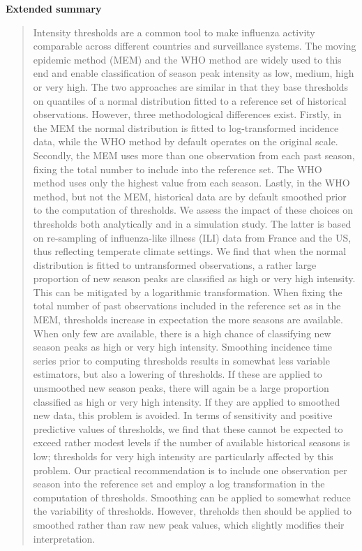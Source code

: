 \documentclass{article}
\begin{document}
\begin{center}
\textbf{Extended summary}
\end{center}

{\begin{quote}
\footnotesize Intensity thresholds are a common tool to make influenza activity comparable across different countries and surveillance systems. The moving epidemic method (MEM) and the WHO method are widely used to this end and enable classification of season peak intensity as low, medium, high or very high. The two approaches are similar in that they base thresholds on quantiles of a normal distribution fitted to a reference set of historical observations. However, three methodological differences exist. Firstly, in the MEM the normal distribution is fitted to log-transformed incidence data, while the WHO method by default operates on the original scale. Secondly, the MEM uses more than one observation from each past season, fixing the total number to include into the reference set. The WHO method uses only the highest value from each season. Lastly, in the WHO method, but not the MEM, historical data are by default  smoothed prior to the computation of thresholds. We assess the impact of these choices on thresholds both analytically and in a simulation study. The latter is based on re-sampling of influenza-like illness (ILI) data from France and the US, thus reflecting temperate climate settings. We find that when the normal distribution is fitted to untransformed observations, a rather large proportion of new season peaks are classified as high or very high intensity. This can be mitigated by a logarithmic transformation. When fixing the total number of past observations included in the reference set as in the MEM, thresholds increase in expectation the more seasons are available. When only few are available, there is a high chance of classifying new season peaks as high or very high intensity. Smoothing incidence time series prior to computing thresholds results in somewhat less variable estimators, but also a lowering of thresholds. If these are applied to unsmoothed new season peaks, there will again be a large proportion classified as high or very high intensity. If they are applied to smoothed new data, this problem is avoided. In terms of sensitivity and positive predictive values of thresholds, we find that these cannot be expected to exceed rather modest levels if the number of available historical seasons is low; thresholds for very high intensity are particularly affected by this problem. Our practical recommendation is to include one observation per season into the reference set and employ a log transformation in the computation of thresholds. Smoothing can be applied to somewhat reduce the variability of thresholds. However, threholds then should be applied to smoothed rather than raw new peak values, which slightly modifies their interpretation.
\end{quote}}
\end{document}
